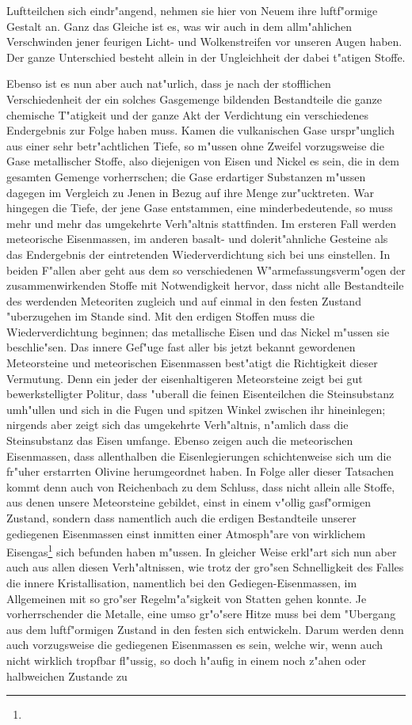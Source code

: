 \documentclass[a4paper, 8pt, oneside, polutonikogreek, german]{article}
\begin{document}
Luftteilchen sich eindr"angend, nehmen sie hier von Neuem ihre luftf"ormige Gestalt an. Ganz das Gleiche ist es, was wir auch in dem allm"ahlichen Verschwinden jener feurigen Licht- und Wolkenstreifen vor unseren Augen haben. Der ganze Unterschied besteht allein in der Ungleichheit der dabei t"atigen Stoffe.

Ebenso ist es nun aber auch nat"urlich, dass je nach der stofflichen Verschiedenheit der ein solches Gasgemenge bildenden Bestandteile die ganze chemische T"atigkeit und der ganze Akt der Verdichtung ein verschiedenes Endergebnis zur Folge haben muss. Kamen die vulkanischen Gase urspr"unglich aus einer sehr betr"achtlichen Tiefe, so m"ussen ohne Zweifel vorzugsweise die Gase metallischer Stoffe, also diejenigen von Eisen und Nickel es sein, die in dem gesamten Gemenge vorherrschen; die Gase erdartiger Substanzen m"ussen dagegen im Vergleich zu Jenen in Bezug auf ihre Menge zur"ucktreten. War hingegen die Tiefe, der jene Gase entstammen, eine minderbedeutende, so muss mehr und mehr das umgekehrte Verh"altnis stattfinden. Im ersteren Fall werden meteorische Eisenmassen, im anderen basalt- und dolerit"ahnliche Gesteine als das Endergebnis der eintretenden Wiederverdichtung sich bei uns einstellen. In beiden F"allen aber geht aus dem so verschiedenen W"armefassungsverm"ogen der zusammenwirkenden Stoffe mit Notwendigkeit hervor, dass nicht alle Bestandteile des werdenden Meteoriten zugleich und auf einmal in den festen Zustand "uberzugehen im Stande sind. Mit den erdigen Stoffen muss die Wiederverdichtung beginnen; das metallische Eisen und das Nickel m"ussen sie beschlie"sen. Das innere Gef"uge fast aller bis jetzt bekannt gewordenen Meteorsteine und meteorischen Eisenmassen best"atigt die Richtigkeit dieser Vermutung. Denn ein jeder der eisenhaltigeren Meteorsteine zeigt bei gut bewerkstelligter Politur, dass "uberall die feinen Eisenteilchen die Steinsubstanz umh"ullen und sich in die Fugen und spitzen Winkel zwischen ihr hineinlegen; nirgends aber zeigt sich das umgekehrte Verh"altnis, n"amlich dass die Steinsubstanz das Eisen umfange. Ebenso zeigen auch die meteorischen Eisenmassen, dass allenthalben die Eisenlegierungen schichtenweise sich um die fr"uher erstarrten Olivine herumgeordnet haben. In Folge aller dieser Tatsachen kommt denn auch von Reichenbach zu dem Schluss, dass nicht allein alle Stoffe, aus denen unsere Meteorsteine gebildet, einst in einem v"ollig gasf"ormigen Zustand, sondern dass namentlich auch die erdigen Bestandteile unserer gediegenen Eisenmassen einst inmitten einer Atmosph"are von wirklichem Eisengas\footnote{} sich befunden haben m"ussen. In gleicher Weise erkl"art sich nun aber auch aus allen diesen Verh"altnissen, wie trotz der gro"sen Schnelligkeit des Falles die innere Kristallisation, namentlich bei den Gediegen-Eisenmassen, im Allgemeinen mit so gro"ser Regelm"a"sigkeit von Statten gehen konnte. Je vorherrschender die Metalle, eine umso gr"o"sere Hitze muss bei dem "Ubergang aus dem luftf"ormigen Zustand in den festen sich entwickeln. Darum werden denn auch vorzugsweise die gediegenen Eisenmassen es sein, welche wir, wenn auch nicht wirklich tropfbar fl"ussig, so doch h"aufig in einem noch z"ahen oder halbweichen Zustande zu 
\end{document}
